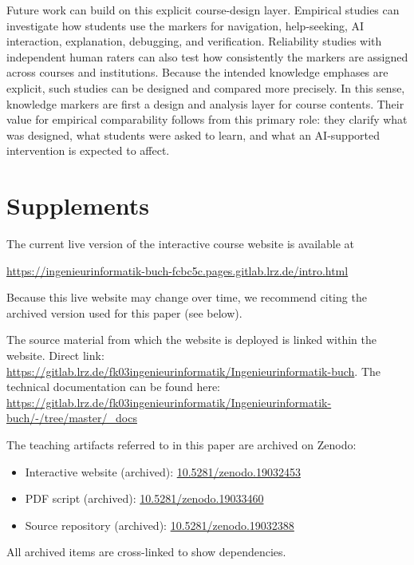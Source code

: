 \documentclass{article}
\begin{document}
Future work can build on this explicit course-design layer. Empirical studies can investigate how students use the markers for navigation, help-seeking, AI interaction, explanation, debugging, and verification. Reliability studies with independent human raters can also test how consistently the markers are assigned across courses and institutions. Because the intended knowledge emphases are explicit, such studies can be designed and compared more precisely. In this sense, knowledge markers are first a design and analysis layer for course contents. Their value for empirical comparability follows from this primary role: they clarify what was designed, what students were asked to learn, and what an AI-supported intervention is expected to affect.\par





\appendix
\section{Supplements}
\label{app:artifacts-and-availability}

The current live version of the interactive course website is available at

\url{https://ingenieurinformatik-buch-fcbc5c.pages.gitlab.lrz.de/intro.html}

Because this live website may change over time, we recommend citing the archived version used for this paper (see below).

The source material from which the website is deployed is linked within the website. Direct link: \url{https://gitlab.lrz.de/fk03ingenieurinformatik/Ingenieurinformatik-buch}. The technical documentation can be found here: \url{https://gitlab.lrz.de/fk03ingenieurinformatik/Ingenieurinformatik-buch/-/tree/master/_docs}


The teaching artifacts referred to in this paper are archived on Zenodo:\par
\begin{itemize}[leftmargin=*]
  \item Interactive website (archived): \href{https://doi.org/10.5281/zenodo.19032453}{10.5281/zenodo.19032453}\vspace{-1mm}
  \item PDF script (archived): \href{https://doi.org/10.5281/zenodo.19033460}{10.5281/zenodo.19033460}\vspace{-1mm}
  \item Source repository (archived): \href{https://doi.org/10.5281/zenodo.19032388}{10.5281/zenodo.19032388}
\end{itemize}
\vspace{-1mm}
All archived items are cross-linked to show dependencies.
\end{document}

